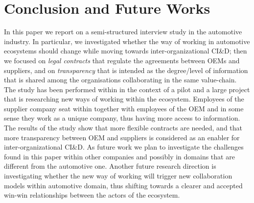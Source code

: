 \section{Conclusion and Future Works}\label{sec:conclusion}

In this paper %
we report on a semi-structured interview study in the automotive industry. In particular, %
we investigated whether the way of working in automotive ecosystems should change while moving towards inter-organizational CI\&D; then we focused on {\em legal contracts} that regulate the agreements between OEMs and suppliers, and   
on {\em transparency} that is intended as the degree/level of information that is shared among the organisations collaborating in the same value-chain. %
The study has been performed within \company{} in the context of a pilot and a large project that is researching new ways of working within the ecosystem. Employees of the supplier company seat within \company{} together with employees of the OEM and in some sense they work as a unique company, thus having more access to information. 
The results of the study show that more flexible contracts are needed, and that more transparency between OEM and suppliers is considered as an enabler for inter-organizational CI\&D. 
%
As future work we plan to investigate the challenges found in this paper within other companies and possibly in domains that are different from the automotive one. Another future research direction is investigating whether the new way of working will trigger new collaboration models within automotive domain, thus shifting towards a clearer and accepted win-win relationships between the actors of the ecosystem.